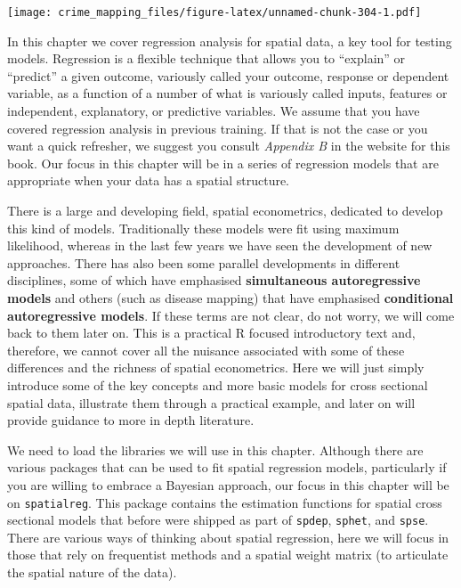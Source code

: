 \documentclass[
  krantz2]{krantz}
\begin{document}
\texttt{[image: crime\_mapping\_files/figure-latex/unnamed-chunk-304-1.pdf]}

In this chapter we cover regression analysis for spatial data, a key tool for testing models. Regression is a flexible technique that allows you to ``explain'' or ``predict'' a given outcome, variously called your outcome, response or dependent variable, as a function of a number of what is variously called inputs, features or independent, explanatory, or predictive variables. We assume that you have covered regression analysis in previous training. If that is not the case or you want a quick refresher, we suggest you consult \emph{Appendix B} in the website for this book. Our focus in this chapter will be in a series of regression models that are appropriate when your data has a spatial structure.

There is a large and developing field, spatial econometrics, dedicated to develop this kind of models. Traditionally these models were fit using maximum likelihood, whereas in the last few years we have seen the development of new approaches. There has also been some parallel developments in different disciplines, some of which have emphasised \textbf{simultaneous autoregressive models} and others (such as disease mapping) that have emphasised \textbf{conditional autoregressive models}. If these terms are not clear, do not worry, we will come back to them later on. This is a practical R focused introductory text and, therefore, we cannot cover all the nuisance associated with some of these differences and the richness of spatial econometrics. Here we will just simply introduce some of the key concepts and more basic models for cross sectional spatial data, illustrate them through a practical example, and later on will provide guidance to more in depth literature.

We need to load the libraries we will use in this chapter. Although there are various packages that can be used to fit spatial regression models, particularly if you are willing to embrace a Bayesian approach, our focus in this chapter will be on \texttt{spatialreg}. This package contains the estimation functions for spatial cross sectional models that before were shipped as part of \texttt{spdep}, \texttt{sphet}, and \texttt{spse}. There are various ways of thinking about spatial regression, here we will focus in those that rely on frequentist methods and a spatial weight matrix (to articulate the spatial nature of the data).
\end{document}
